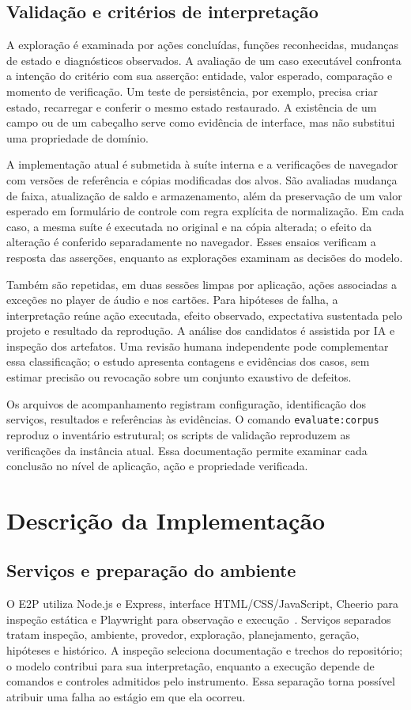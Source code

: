 \documentclass[12pt]{article}
\begin{document}
\subsection{Validação e critérios de interpretação}
A exploração é examinada por ações concluídas, funções reconhecidas, mudanças de estado e diagnósticos observados. A avaliação de um caso executável confronta a intenção do critério com sua asserção: entidade, valor esperado, comparação e momento de verificação. Um teste de persistência, por exemplo, precisa criar estado, recarregar e conferir o mesmo estado restaurado. A existência de um campo ou de um cabeçalho serve como evidência de interface, mas não substitui uma propriedade de domínio.

A implementação atual é submetida à suíte interna e a verificações de navegador com versões de referência e cópias modificadas dos alvos. São avaliadas mudança de faixa, atualização de saldo e armazenamento, além da preservação de um valor esperado em formulário de controle com regra explícita de normalização. Em cada caso, a mesma suíte é executada no original e na cópia alterada; o efeito da alteração é conferido separadamente no navegador. Esses ensaios verificam a resposta das asserções, enquanto as explorações examinam as decisões do modelo.

Também são repetidas, em duas sessões limpas por aplicação, ações associadas a exceções no player de áudio e nos cartões. Para hipóteses de falha, a interpretação reúne ação executada, efeito observado, expectativa sustentada pelo projeto e resultado da reprodução. A análise dos candidatos é assistida por IA e inspeção dos artefatos. Uma revisão humana independente pode complementar essa classificação; o estudo apresenta contagens e evidências dos casos, sem estimar precisão ou revocação sobre um conjunto exaustivo de defeitos.

Os arquivos de acompanhamento registram configuração, identificação dos serviços, resultados e referências às evidências. O comando \texttt{evaluate:corpus} reproduz o inventário estrutural; os scripts de validação reproduzem as verificações da instância atual. Essa documentação permite examinar cada conclusão no nível de aplicação, ação e propriedade verificada.


\section{Descrição da Implementação}\label{sec:implementation}
\subsection{Serviços e preparação do ambiente}
O E2P utiliza Node.js e Express, interface HTML/CSS/JavaScript, Cheerio para inspeção estática e Playwright para observação e execução~\cite{microsoft2026playwright}. Serviços separados tratam inspeção, ambiente, provedor, exploração, planejamento, geração, hipóteses e histórico. A inspeção seleciona documentação e trechos do repositório; o modelo contribui para sua interpretação, enquanto a execução depende de comandos e controles admitidos pelo instrumento. Essa separação torna possível atribuir uma falha ao estágio em que ela ocorreu.
\end{document}
